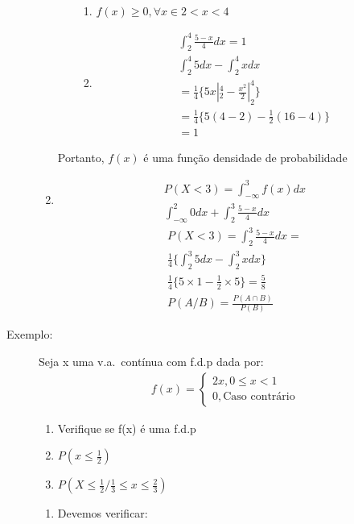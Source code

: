 \begin{description}
\begin{enumerate}[label=(\alph*)]
\begin{enumerate}[leftmargin=*, label=\Roman*., widest=IV, align=left]
               \begin{enumerate} %
                 \item $f(x)\geq 0, \forall x \in  2<x<4$
                 \item 
                   \begin{align*}
                     \int_{2}^4 \frac{5-x}{4}dx=1\\
                     \int_{2}^4 5 dx - \int_{2}^4 x dx  \\
                     = \frac{1}{4} \{5x|^4_2 - \frac{x^2}{2}|^4_2 \}\\
                     = \frac{1}{4} \{5(4-2)- \frac{1}{2}(16-4)\} \\
                     = 1
                   \end{align*}
               \end{enumerate}

           \end{enumerate}
           Portanto, $f(x)$ é uma função densidade de probabilidade 
         \item 
           \begin{align*}
             P(X<3)= \int_{-\infty}^{3} f(x)dx \\
             \int_{-\infty}^{2}0 dx +      \int_{2}^{3} \frac{5-x}{4} dx 
           \end{align*}
           \begin{align*}
             P(X<3)=\int_{2}^{3} \frac{5-x}{4} dx =\\
             \frac{1}{4}\{ \int_{2}^{3} 5 dx - \int_{2}^{3} x dx \}\\
             \frac{1}{4}\{ 5\times 1- \frac{1}{2}\times 5\}= \frac{5}{8}\\
             P(A/B)=\frac{P(A\cap B)}{P(B)}
           \end{align*}
       \end{enumerate}
     \item [Exemplo:] Seja x uma v.a.\ contínua com f.d.p dada por:
       \begin{align*}
         f(x)= 
         \begin{cases}
           2x, 0\le x < 1 \\ 
           0, \text{Caso contrário}
         \end{cases}
       \end{align*}
       \begin{enumerate}[label=(\alph*)]
         \item Verifique se f(x) é uma f.d.p
         \item$ P(x\le \frac{1}{2})$
         \item $P(X\le \frac{1}{2} / \frac{1}{3} \le x \le \frac{2}{3})$
       \end{enumerate}
       \begin{enumerate}[label=(\alph*)]
         \item 
           Devemos verificar: 
               \begin{enumerate}[leftmargin=*, label=\roman*., widest=IV, align=left] %


\end{enumerate}
\end{enumerate}
\end{description}
